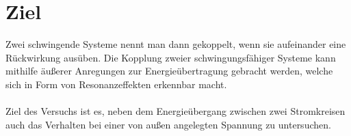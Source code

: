 \section{Ziel}
\label{sec:Ziel}
\setlength{\parindent}{0pt}
Zwei schwingende Systeme nennt man dann gekoppelt, wenn sie aufeinander eine Rückwirkung ausüben. 
Die Kopplung zweier schwingungsfähiger Systeme kann mithilfe äußerer Anregungen zur Energieübertragung gebracht werden, 
welche sich in Form von Resonanzeffekten erkennbar macht.\\
\\
Ziel des Versuchs ist es, neben dem Energieübergang zwischen zwei Stromkreisen auch das Verhalten bei einer von außen 
angelegten Spannung zu untersuchen.